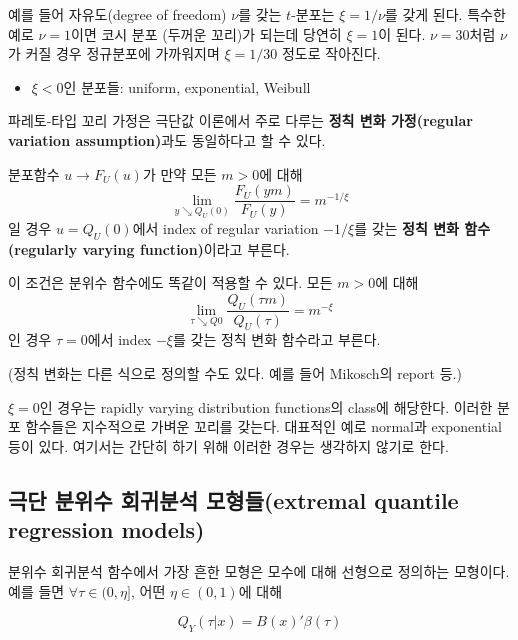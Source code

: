 \documentclass[b5paper,]{scrbook}
\providecommand{\tightlist}{%
  \setlength{\itemsep}{0pt}\setlength{\parskip}{0pt}}
\theoremstyle{plain}
\theoremstyle{definition}
\numberwithin{equation}{section}
\let\BeginKnitrBlock\begin \let\EndKnitrBlock\end
\begin{document}
예를 들어 자유도(degree of freedom) \(\nu\)를 갖는 \(t\)-분포는 \(\xi=1/\nu\)를 갖게 된다. 특수한 예로 \(\nu=1\)이면 코시 분포 (두꺼운 꼬리)가 되는데 당연히 \(\xi=1\)이 된다. \(\nu=30\)처럼 \(\nu\)가 커질 경우 정규분포에 가까워지며 \(\xi=1/30\) 정도로 작아진다.

\begin{itemize}
\tightlist
\item
  \(\xi<0\)인 분포들: uniform, exponential, Weibull
\end{itemize}

파레토-타입 꼬리 가정은 극단값 이론에서 주로 다루는 \textbf{정칙 변화 가정(regular variation assumption)}과도 동일하다고 할 수 있다.

\BeginKnitrBlock{definition}[정칙 변화]
\protect\hypertarget{def:unnamed-chunk-350}{}{\label{def:unnamed-chunk-350} {} }분포함수 \(u \rightarrow F_{U}(u)\)가 만약 모든 \(m>0\)에 대해
\[\lim_{y\searrow Q_{U}(0)}\frac{F_{U}(ym)}{F_{U}(y)}=m^{-1/\xi}\]
일 경우 \(u=Q_{U}(0)\)에서 index of regular variation \(-1/\xi\)를 갖는 \textbf{정칙 변화 함수(regularly varying function)}이라고 부른다.

이 조건은 분위수 함수에도 똑같이 적용할 수 있다. 모든 \(m>0\)에 대해
\[\lim_{\tau\searrow Q0}\frac{Q_{U}(\tau m)}{Q_{U}(\tau)}=m^{-\xi}\]
인 경우 \(\tau=0\)에서 index \(-\xi\)를 갖는 정칙 변화 함수라고 부른다.
\EndKnitrBlock{definition}

(정칙 변화는 다른 식으로 정의할 수도 있다. 예를 들어 Mikosch의 report 등.)

\(\xi=0\)인 경우는 rapidly varying distribution functions의 class에 해당한다. 이러한 분포 함수들은 지수적으로 가벼운 꼬리를 갖는다. 대표적인 예로 normal과 exponential 등이 있다. 여기서는 간단히 하기 위해 이러한 경우는 생각하지 않기로 한다.

\hypertarget{---extremal-quantile-regression-models}{%
\subsection{극단 분위수 회귀분석 모형들(extremal quantile regression models)}\label{---extremal-quantile-regression-models}}

분위수 회귀분석 함수에서 가장 흔한 모형은 모수에 대해 선형으로 정의하는 모형이다. 예를 들면 \(\forall \tau \in (0,\eta]\), 어떤 \(\eta \in (0,1)\)에 대해

\begin{equation}
Q_{Y}(\tau|x)=B(x)'\beta(\tau)
\label{eq:qrfctmodel}
\end{equation}
\end{document}

